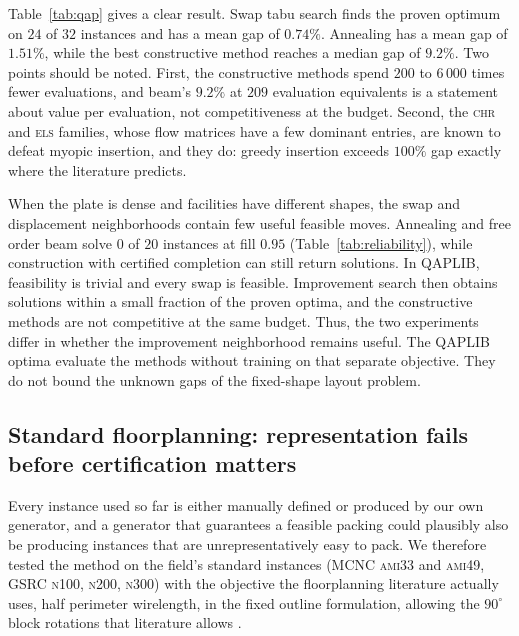 \documentclass[preprint,12pt,authoryear]{elsarticle}
\begin{document}
Table~\ref{tab:qap} gives a clear result. Swap tabu
search finds the proven optimum on $24$ of $32$ instances and has a mean gap
of $0.74\%$. Annealing has a mean gap of $1.51\%$, while the best constructive method reaches
a median gap of $9.2\%$. Two points should be noted. First, the constructive methods
spend $200$ to $6\,000$ times fewer
evaluations, and beam's $9.2\%$ at $209$ evaluation equivalents is a statement
about value per evaluation, not competitiveness at the budget. Second, the
\textsc{chr} and \textsc{els} families, whose flow matrices have a few dominant
entries, are known to defeat myopic insertion, and they do: greedy insertion
exceeds $100\%$ gap exactly where the literature predicts.

When the plate is dense and facilities have different shapes,
the swap and displacement neighborhoods contain few useful feasible moves.
Annealing and free order beam solve $0$ of $20$ instances at fill $0.95$
(Table~\ref{tab:reliability}), while construction with certified completion can
still return solutions. In QAPLIB, feasibility is trivial and every swap is
feasible. Improvement search then obtains solutions within a small fraction of
the proven optima, and the constructive methods are not competitive at the same
budget. Thus, the two experiments differ in whether the improvement neighborhood
remains useful. The QAPLIB optima evaluate the methods without training on that
separate objective. They do not bound the unknown gaps of the fixed-shape layout
problem.

\subsection{Standard floorplanning: representation fails before certification matters}
\label{sec:results_mcnc}

Every instance used so far is either manually defined or produced by our own
generator, and a generator that guarantees a feasible packing could plausibly
also be producing instances that are unrepresentatively easy to pack. We
therefore tested the method on the field's standard instances (MCNC
\textsc{ami33} and \textsc{ami49}, GSRC \textsc{n100}, \textsc{n200},
\textsc{n300}) with the objective the floorplanning literature actually uses,
half perimeter wirelength, in the fixed outline formulation, allowing the
$90^\circ$ block rotations that literature allows
\citep{Murata1996SequencePair,Adya2003FixedOutline}.
\end{document}
